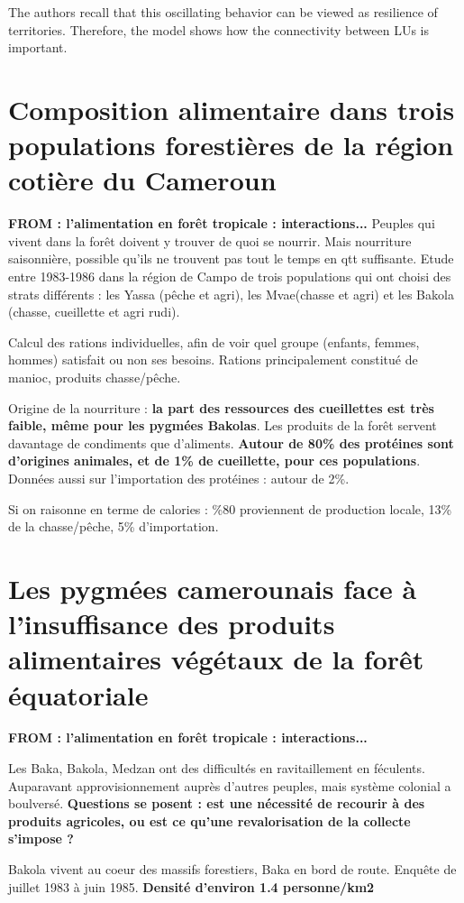 \documentclass{article}
\begin{document}
The authors recall that this oscillating behavior can be viewed as resilience of territories. Therefore, the model shows how the connectivity between LUs is important.

\newpage
\section{Composition alimentaire dans trois populations forestières de la région cotière du Cameroun}
\textbf{FROM : l'alimentation en forêt tropicale : interactions...}
Peuples qui vivent dans la forêt doivent y trouver de quoi se nourrir. Mais nourriture saisonnière, possible qu'ils ne trouvent pas tout le temps en qtt suffisante. Etude entre 1983-1986 dans la région de Campo de trois populations qui ont choisi des strats différents : les Yassa (pêche et agri), les Mvae(chasse et agri) et les Bakola (chasse, cueillette et agri rudi).

Calcul des rations individuelles, afin de voir quel groupe (enfants, femmes, hommes) satisfait ou non ses besoins. Rations principalement constitué de manioc, produits chasse/pêche.

Origine de la nourriture : \textbf{la part des ressources des cueillettes est très faible, même pour les pygmées Bakolas}. Les produits de la forêt servent davantage de condiments que d'aliments. \textbf{Autour de 80\% des protéines sont d'origines animales, et de 1\% de cueillette, pour ces populations}. Données aussi sur l'importation des protéines : autour de 2\%.

Si on raisonne en terme de calories : \%80 proviennent de production locale, 13\% de la chasse/pêche, 5\% d'importation.

\section{Les pygmées camerounais face à l'insuffisance des produits alimentaires végétaux de la forêt équatoriale}
\textbf{FROM : l'alimentation en forêt tropicale : interactions...}

Les Baka, Bakola, Medzan ont des difficultés en ravitaillement en féculents. Auparavant approvisionnement auprès d'autres peuples, mais système colonial a boulversé. \textbf{Questions se posent : est une nécessité de recourir à des produits agricoles, ou est ce qu'une revalorisation de la collecte s'impose ?}

Bakola vivent au coeur des massifs forestiers, Baka en bord de route. Enquête de juillet 1983 à juin 1985.
\textbf{Densité d'environ 1.4 personne/km2}
\end{document}
